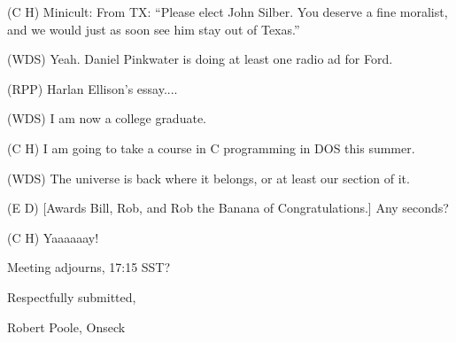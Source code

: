 (C H) Minicult: From TX: ``Please elect John Silber.  You deserve a fine
moralist, and we would just as soon see him stay out of Texas.''

(WDS) Yeah.  Daniel Pinkwater is doing at least one radio ad for Ford.

(RPP) Harlan Ellison's essay....

(WDS) I am now a college graduate.

(C H) I am going to take a course in C programming in DOS this summer.

(WDS) The universe is back where it belongs, or at least our section of it.

(E D) [Awards Bill, Rob, and Rob the Banana of Congratulations.]  Any seconds?

(C H) Yaaaaaay!

Meeting adjourns, 17:15 SST?

\vspace{0.15in}
\begin{center}
Respectfully submitted,

Robert Poole, Onseck
\end{center}

